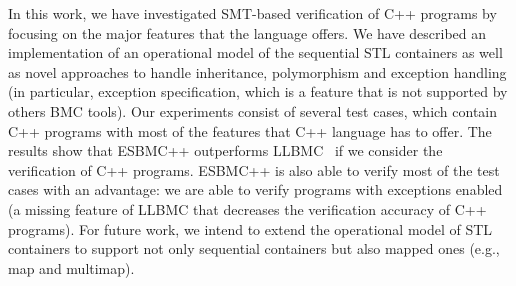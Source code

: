 \documentclass[a4paper]{llncs}
\begin{document}
In this work, we have investigated SMT-based verification of C++ programs
by focusing on the major features that the language offers. We have described
an implementation of an operational model of the sequential STL containers
as well as novel approaches to handle inheritance, polymorphism and exception handling
(in particular, exception specification, which is a feature that is not supported by others
BMC tools). Our experiments consist of several test cases, which contain C++ programs
with most of the features that C++ language has to offer. The results show that
ESBMC++ outperforms LLBMC~\cite{Florian12} if we consider the verification of C++ programs.
ESBMC++ is also able to verify most of the test cases with an advantage: we are able to verify programs
with exceptions enabled (a missing feature of LLBMC that decreases the verification accuracy of
C++ programs). For future work, we intend to extend the operational model of STL containers
to support not only sequential containers but also mapped ones (e.g., map and multimap).

%
\end{document}
